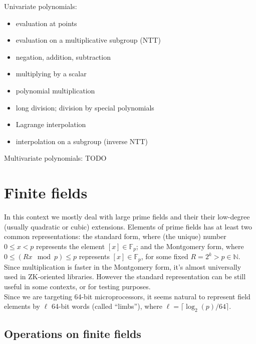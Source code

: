\documentclass[12pt,draft,a4paper,openany,oneside]{amsbook}
\def\F{\mathbb{F}}
\def\N{\mathbb{N}}
\theoremstyle{plain}
\theoremstyle{definition}
\begin{document}
Univariate polynomials:
\begin{itemize}
\item evaluation at points
\item evaluation on a multiplicative subgroup (NTT)
\item negation, addition, subtraction
\item multiplying by a scalar 
\item polynomial multiplication
\item long division; division by special polynomials
\item Lagrange interpolation 
\item interpolation on a subgroup (inverse NTT) \\
\end{itemize}

Multivariate polynomials: TODO


\chapter{Finite fields}

In this context we mostly deal with large prime fields and their their low-degree
(usually quadratic or cubic) extensions. Elements of prime fields has at least two common
representations: the standard form, where (the unique) number $0\le x < p$ represents
the element $[x]\in \F_p$; and the Montgomery form, where $0 \le (Rx \mod p) \le p$ represents
$[x]\in\F_p$, for some fixed $R=2^k>p\in\N$. Since multiplication is faster in the Montgomery
form, it's almost universally used in ZK-oriented libraries. However the standard
representation can be still useful in some contexts, or for testing purposes.\\

Since we are targeting 64-bit microprocessors, it seems natural to represent
field elements by $\ell$ 64-bit words (called ``limbs''), where $\ell=\lceil \log_2(p)/64 \rceil$.


\section{Operations on finite fields}
\end{document}

